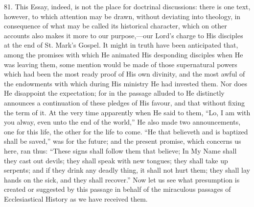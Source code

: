 81.
This Essay, indeed, is not the place for doctrinal discussions: there
is one text, however, to which attention may be drawn, without
deviating into theology, in consequence of what may be called its
historical character, which on other accounts also makes it more to
our purpose,—our Lord's charge to His disciples at the end of St.
Mark's Gospel. It might in truth have been anticipated that, among the
promises with which He animated His desponding disciples when He was
leaving them, some mention would be made of those supernatural powers
which had been the most ready proof of His own divinity, and the most
awful of the endowments with which during His ministry He had invested
them. Nor does He disappoint the expectation; for in the passage
alluded to He distinctly announces a continuation of these pledges of
His favour, and that without fixing the term of it. At the very time
apparently when He said to them, ``Lo, I am with you alway, even unto
the end of the world,'' He also made two announcements, one for this
life, the other for the life to come. ``He that believeth and is
baptized shall be saved,'' was for the future; and the present promise,
which concerns us here, ran thus: ``These signs shall follow them that
believe; In My Name shall they cast out devils; they shall speak with
new tongues; they shall take up serpents; and if they drink any deadly
thing, it shall not hurt them; they shall lay hands on the sick, and
they shall recover.'' Now let us see what presumption is created
or suggested by this passage in behalf of the miraculous passages of
Ecclesiastical History as we have received them.

